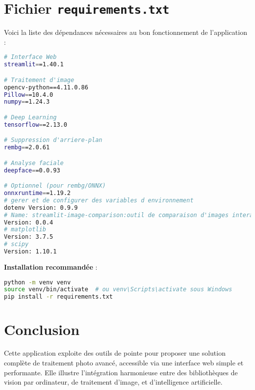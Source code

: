 \documentclass[a4paper,12pt]{article}
\begin{document}
\section*{Fichier \texttt{requirements.txt}}

Voici la liste des dépendances nécessaires au bon fonctionnement de l’application :

\begin{lstlisting}[language=bash]
# Interface Web
streamlit==1.40.1

# Traitement d'image
opencv-python==4.11.0.86
Pillow==10.4.0
numpy==1.24.3

# Deep Learning
tensorflow==2.13.0

# Suppression d'arriere-plan
rembg==2.0.61

# Analyse faciale
deepface==0.0.93

# Optionnel (pour rembg/ONNX)
onnxruntime==1.19.2
# gerer et de configurer des variables d environnement
dotenv Version: 0.9.9
# Name: streamlit-image-comparison:outil de comparaison d'images interactif d image dans les app streamlit
Version: 0.0.4
# matplotlib
Version: 3.7.5
# scipy
Version: 1.10.1
\end{lstlisting}

\textbf{Installation recommandée} :

\begin{lstlisting}[language=bash]
python -m venv venv
source venv/bin/activate  # ou venv\Scripts\activate sous Windows
pip install -r requirements.txt
\end{lstlisting}

\section*{Conclusion}
Cette application exploite des outils de pointe pour proposer une solution complète de traitement photo avancé, accessible via une interface web simple et performante. Elle illustre l'intégration harmonieuse entre des bibliothèques de vision par ordinateur, de traitement d'image, et d'intelligence artificielle.
\end{document}
